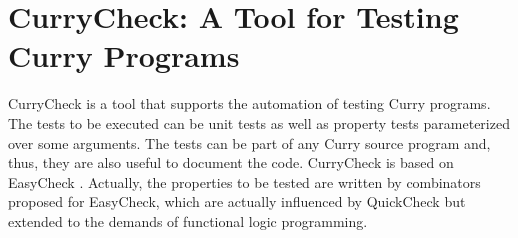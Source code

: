 \section{CurryCheck: A Tool for Testing Curry Programs}

CurryCheck is a tool that supports the automation of
testing Curry programs.
The tests to be executed can be unit tests as well as
property tests parameterized over some arguments.
The tests can be part of any Curry source program
and, thus, they are also useful to document the code.
CurryCheck is based on EasyCheck \cite{ChristiansenFischer08FLOPS}.
Actually, the properties to be tested are written
by combinators proposed for EasyCheck, which are actually
influenced by QuickCheck \cite{ClaessenHughes00}
but extended to the demands of functional logic programming.

